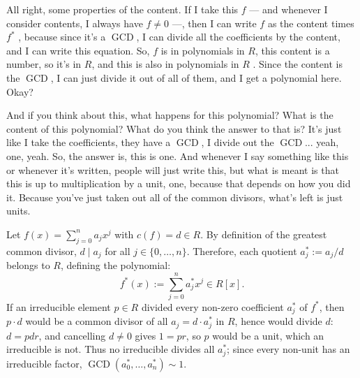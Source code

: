 \begin{speech}[00:04:53 - 00:06:10]
All right, some properties of the content. If I take this $f$ --- and whenever I consider contents, I always have $f \neq 0$ ---, then I can write $f$ as the content times $f^*$ , because since it's a $\operatorname{GCD}$, I can divide all the coefficients by the content, and I can write this equation. So, $f$ is in polynomials in $R$, this content is a number, so it's in $R$, and this is also in polynomials in $R$ . Since the content is the $\operatorname{GCD}$, I can just divide it out of all of them, and I get a polynomial here. Okay?

And if you think about this, what happens for this polynomial? What is the content of this polynomial? What do you think the answer to that is? It's just like I take the coefficients, they have a $\operatorname{GCD}$, I divide out the $\operatorname{GCD}$... yeah, one, yeah.  So, the answer is, this is one. And whenever I say something like this or whenever it's written, people will just write this, but what is meant is that this is up to multiplication by a unit, one, because that depends on how you did it. Because you've just taken out all of the common divisors, what's left is just units.
\end{speech}

\begin{content}

\begin{steps}
Let $f(x) = \sum_{j=0}^n a_j x^j$ with $c(f) = d \in R$. By definition of the greatest common divisor, $d \mid a_j$ for all $j \in \{0, \dots, n\}$. Therefore, each quotient $a_j^* := a_j / d$ belongs to $R$, defining the polynomial:
\[
f^*(x) := \sum_{j=0}^n a_j^* x^j \in R[x].
\]
If an irreducible element $p \in R$ divided every non-zero coefficient $a_j^*$ of $f^*$, then $p \cdot d$ would be a common divisor of all $a_j = d \cdot a_j^*$ in $R$, hence would divide $d$: $d = p d r$, and cancelling $d \neq 0$ gives $1 = p r$, so $p$ would be a unit, which an irreducible is not. Thus no irreducible divides all $a_j^*$; since every non-unit has an irreducible factor, $\operatorname{GCD}(a_0^*, \dots, a_n^*) \sim 1$.
\end{steps}
\end{content}

